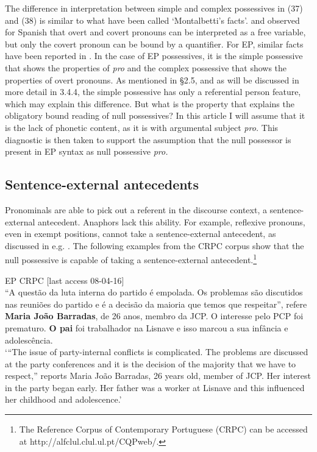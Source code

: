 \documentclass[output=paper]{langsci/langscibook}
\begin{document}
The difference in interpretation between simple and complex possessives in (37) and (38) is similar to what have been called ‘Montalbetti’s facts’. \citet{Montalbetti1984} and \citet{Alonso-Ovalle2001} observed for Spanish that overt and covert pronouns can be interpreted as a free variable, but only the covert pronoun can be bound by a quantifier. For EP, similar facts have been reported in \citet{Lobo2013}. In the case of EP possessives, it is the simple possessive that shows the properties of \textit{pro} and the complex possessive that shows the properties of overt pronouns. As mentioned in §2.5, and as will be discussed in more detail in 3.4.4, the simple possessive has only a referential person feature, which may explain this difference. But what is the property that explains the obligatory bound reading of null possessives? In this article I will assume that it is the lack of phonetic content, as it is with argumental subject \textit{pro.} This diagnostic is then taken to support the assumption that the null possessor is present in EP syntax as null possessive \textit{pro.}

\subsection{Sentence-external antecedents}%

Pronominals are able to pick out a referent in the discourse context, a sentence-external antecedent. Anaphors lack this ability. For example, reflexive pronouns, even in exempt positions, cannot take a sentence-external antecedent, as discussed in e.g. \citet{Campos1995}. The following examples from the CRPC corpus show that the null possessive is capable of taking a sentence-external antecedent.\footnote{The Reference Corpus of Contemporary Portuguese (CRPC) can be accessed at http://alfclul.clul.ul.pt/CQPweb/.}

\ea%
    EP   CRPC [last access 08-04-16]\label{ex:wein:40}\\
    “A questão da luta interna do partido é empolada. Os problemas são discutidos nas reuniões do partido e é a decisão da maioria que temos que respeitar”, refere \textbf{Maria João Barradas}, de 26 anos, membro da JCP. O interesse pelo PCP foi prematuro. \textbf{O pai} foi trabalhador na Lisnave e isso marcou a sua infância e adolescência.\\
    \glt ‘“The issue of party-internal conflicts is complicated. The problems are discussed at the party conferences and it is the decision of the majority that we have to respect,” reports Maria João Barradas, 26 years old, member of JCP. Her interest in the party began early. Her father was a worker at Lisnave and this influenced her childhood and adolescence.’
\z
\end{document}
